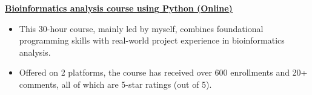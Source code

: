 \textbf{\href{https://www.bioinfo.info/p/t_pc/goods_pc_detail/goods_detail/course_2SvfNlIVzrKfOcexHk9Nute5Bhd}{Bioinformatics analysis course using Python (Online)}}
\begin{itemize}
    \item This 30-hour course, mainly led by myself, combines foundational programming skills with real-world project experience in bioinformatics analysis. 
    \item Offered on 2 platforms, the course has received over 600 enrollments and 20+ comments, all of which are 5-star ratings (out of 5).
\end{itemize}